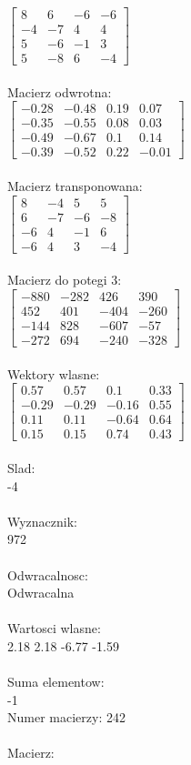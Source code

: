\documentclass[a4paper,12pt]{article}
\begin{document}
$\begin{bmatrix} 8&6&-6&-6\\-4&-7&4&4\\5&-6&-1&3\\5&-8&6&-4 \end{bmatrix}$
\\
\\
Macierz odwrotna:\\

$\begin{bmatrix} -0.28&-0.48&0.19&0.07\\-0.35&-0.55&0.08&0.03\\-0.49&-0.67&0.1&0.14\\-0.39&-0.52&0.22&-0.01 \end{bmatrix}$
\\
\\
Macierz transponowana:\\

$\begin{bmatrix} 8&-4&5&5\\6&-7&-6&-8\\-6&4&-1&6\\-6&4&3&-4 \end{bmatrix}$
\\
\\
Macierz do potegi 3:\\

$\begin{bmatrix} -880&-282&426&390\\452&401&-404&-260\\-144&828&-607&-57\\-272&694&-240&-328 \end{bmatrix}$
\\
\\
Wektory wlasne:\\

$\begin{bmatrix} 0.57&0.57&0.1&0.33\\-0.29&-0.29&-0.16&0.55\\0.11&0.11&-0.64&0.64\\0.15&0.15&0.74&0.43 \end{bmatrix}$
\\
\\
Slad:\\
-4
\\
\\
Wyznacznik:\\
972
\\
\\
Odwracalnosc:\\
Odwracalna
\\
\\
Wartosci wlasne:\\
2.18 2.18 -6.77 -1.59
\\
\\
Suma elementow:\\
-1
\\
\newpage
Numer macierzy:
242
\\
\\
Macierz:\\
\end{document}
